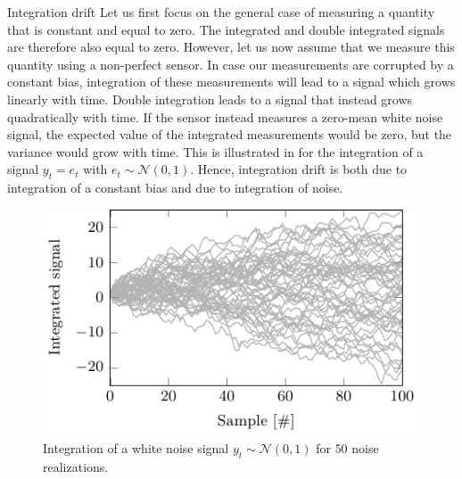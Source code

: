 \begin{myexample}{Integration drift}%
\label{ex:intro-integrationDrift}%
Let us first focus on the general case of measuring a quantity that is constant and equal to zero. The integrated and double integrated signals are therefore also equal to zero. However, let us now assume that we measure this quantity using a non-perfect sensor. In case our measurements are corrupted by a constant bias, integration of these measurements will lead to a signal which grows linearly with time. Double integration leads to a signal that instead grows quadratically with time. If the sensor instead measures a zero-mean white noise signal, the expected value of the integrated measurements would be zero, but the variance would grow with time. This is illustrated in  for the integration of a signal $y_t = e_t$ with $e_t \sim \mathcal{N}(0,1)$. Hence, integration drift is both due to integration of a constant bias and due to integration of noise. 

\begin{figure}
	\centering
	\includegraphics[scale = 1]{figure1_5.pdf}
    	\caption{Integration of a white noise signal $y_t \sim \mathcal{N}(0,1)$ for $50$ noise realizations.}
	\label{fig:intro-integrationDrift}
\end{figure}


\end{myexample}
